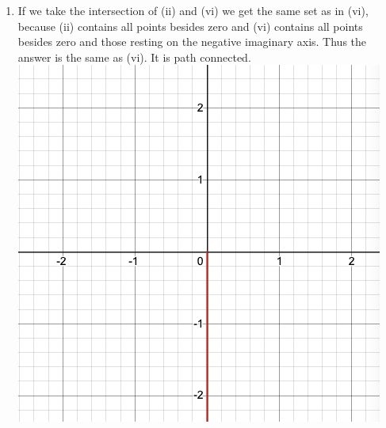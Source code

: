 \documentclass{article}
\begin{document}
\begin{enumerate}
\begin{enumerate}[label=\roman*]
        \item
          If we take the intersection of (ii) and (vi) we get the same set as in (vi), because (ii) contains all points besides zero and (vi) contains all points besides zero and those resting on the negative imaginary axis. Thus the answer is the same as (vi). It is path connected.\\
          \includegraphics[scale=0.5]{graphs/vi}
      \end{enumerate}
  \end{enumerate}
\end{document}
